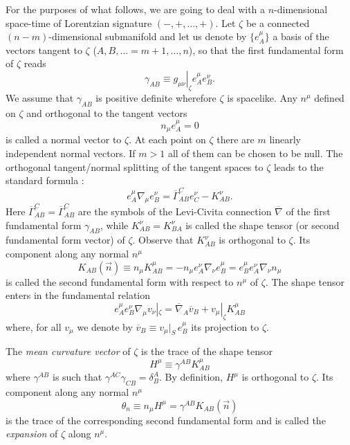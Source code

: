 \documentclass[12pt]{iopart}
\def\be{\begin{equation}}
\def\ee{\end{equation}}
\begin{document}
For the purposes of what follows, we are going to deal with a $n$-dimensional space-time of Lorentzian signature $(-,+,\dots,+)$. Let $\zeta$ be a connected $(n-m)$-dimensional submanifold and let us denote by $\{e^\mu_A\}$ a basis of the vectors tangent to $\zeta$ ($A,B,\dots = m+1,\dots ,n$), so that the first fundamental form of $\zeta$ reads
$$\gamma _{AB}\equiv \left.g_{\mu \nu}\right|_{\zeta} e^\mu_A e^\nu_B.$$
We assume that $\gamma _{AB}$ is positive definite wherefore $\zeta$ is spacelike. 
Any $n^{\mu}$ defined on $\zeta$ and orthogonal to the tangent vectors
$$n_{\mu}e^{\mu}_A=0$$
is called a normal vector to $\zeta$. At each point on $\zeta$ there are $m$ linearly independent normal vectors. If $m>1$ all of them can be chosen to be null. The orthogonal tangent/normal splitting of the tangent spaces to $\zeta$ leads to the standard formula \cite{Kri,O}:
$$
e^\mu_A \nabla_\mu e^\nu_B =\overline{\Gamma}^{C}_{AB}e^\nu_{C}-K^\nu_{AB}.
$$
Here $\overline{\Gamma}^{C}_{AB}=\overline{\Gamma}^{C}_{AB}$ are the symbols of the Levi-Civita 
connection $\overline\nabla$ of the first fundamental form
$\gamma_{AB}$, while $K^\nu_{AB}=K^\nu_{BA}$ is called the shape tensor (or second fundamental form vector) of $\zeta$. Observe that $K^\nu_{AB}$ is orthogonal to $\zeta$. Its component along any normal $n^\mu$
$$
K_{AB}(\vec n)\equiv n_{\mu}K^{\mu}_{AB}= -n_{\mu}e^{\nu}_A\nabla_{\nu}e^{\mu}_B = e^{\mu}_Be^{\nu}_A\nabla_{\nu}n_{\mu} 
$$
is called the second fundamental form with respect to $n^{\mu}$ of $\zeta$.
The shape tensor enters in the fundamental relation
\be
e^{\mu}_{A}e^{\nu}_{B}\nabla_{\mu}v_{\nu}|_{\zeta}=\overline\nabla_{A} 
\overline{v}_{B}+v_{\mu}|_{\zeta} K^{\mu}_{AB}
\label{nablas2}
\ee
where, for all $v_{\mu}$ we denote by $\overline{v}_{B}\equiv v_{\mu}|_{S}\, e^{\mu}_{B}$
its projection to $\zeta$.

The {\em mean curvature vector} of $\zeta$ is the trace of the shape tensor  \cite{O,Kri,MS,S2}
$$
H^\mu \equiv \gamma^{AB}K^\mu_{AB}
$$
where $\gamma^{AB}$ is such that $\gamma^{AC}\gamma_{CB}=\delta^{A}_{B}$. By definition, $H^\mu$ is orthogonal to $\zeta$. Its component along any normal $n^\mu$
\be
\theta_n \equiv n_{\mu}H^\mu =\gamma^{AB}K_{AB}(\vec n) \label{expansion}
\ee
is the trace of the corresponding second fundamental form and is called the {\em expansion} of $\zeta$ along $n^\mu$.
\end{document}
